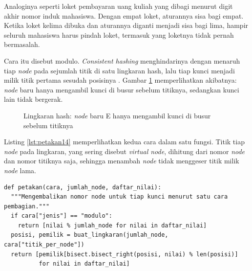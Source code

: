 Analoginya seperti loket pembayaran uang kuliah yang dibagi menurut digit
akhir nomor induk mahasiswa. Dengan empat loket, aturannya sisa bagi empat.
Ketika loket kelima dibuka dan aturannya diganti menjadi sisa bagi lima,
hampir seluruh mahasiswa harus pindah loket, termasuk yang loketnya tidak
pernah bermasalah.

Cara itu disebut modulo. \textit{Consistent hashing} menghindarinya dengan
menaruh tiap \textit{node} pada sejumlah titik di satu lingkaran hash, lalu tiap kunci
menjadi milik titik pertama sesudah posisinya \cite{karger1997consistent}.
Gambar \ref{fig:lingkaran14} memperlihatkan akibatnya: \textit{node} baru hanya
mengambil kunci di busur sebelum titiknya, sedangkan kunci lain tidak
bergerak.

\begin{figure}[!htb]
  \centering
  \caption{Lingkaran hash: \textit{node} baru E hanya mengambil kunci di busur
           sebelum titiknya}
  \label{fig:lingkaran14}
\end{figure}

Listing \ref{lst:petakan14} memperlihatkan kedua cara dalam satu fungsi.
Titik tiap \textit{node} pada lingkaran, yang sering disebut \textit{virtual node},
dihitung dari nomor \textit{node} dan nomor titiknya saja, sehingga menambah \textit{node}
tidak menggeser titik milik \textit{node} lama.

\begin{lstlisting}[style=PythonStyle, caption={Modulo dan \textit{consistent hashing} dalam satu fungsi, tersedia di \berkas{sources/chapter14/partisi.py}}, label={lst:petakan14}]
def petakan(cara, jumlah_node, daftar_nilai):
  """Mengembalikan nomor node untuk tiap kunci menurut satu cara pembagian."""
  if cara["jenis"] == "modulo":
    return [nilai % jumlah_node for nilai in daftar_nilai]
  posisi, pemilik = buat_lingkaran(jumlah_node, cara["titik_per_node"])
  return [pemilik[bisect.bisect_right(posisi, nilai) % len(posisi)]
          for nilai in daftar_nilai]
\end{lstlisting}

